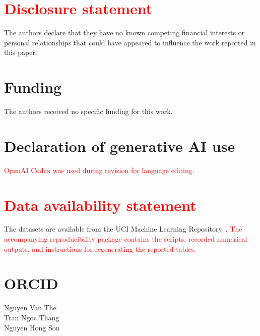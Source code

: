 \documentclass[]{interact}
\theoremstyle{plain}
\theoremstyle{definition}
\theoremstyle{remark}
\begin{document}
\section*{\textcolor{red}{Disclosure statement}}
The authors declare that they have no known competing financial interests or personal relationships that could have appeared to influence the work reported in this paper.
\section*{Funding}
The authors received no specific funding for this work.
\section*{Declaration of generative AI use}
\leavevmode\textcolor{red}{OpenAI Codex was used during revision for language editing.}
\section*{\textcolor{red}{Data availability statement}}
The datasets are available from the UCI Machine Learning Repository~\citep{kelly2023uci}. \leavevmode\textcolor{red}{The accompanying reproducibility package contains the scripts, recorded numerical outputs, and instructions for regenerating the reported tables.}

\section*{ORCID}
\noindent Nguyen Van The~\\ Tran Ngoc Thang~\\ Nguyen Hong Son~
\end{document}
